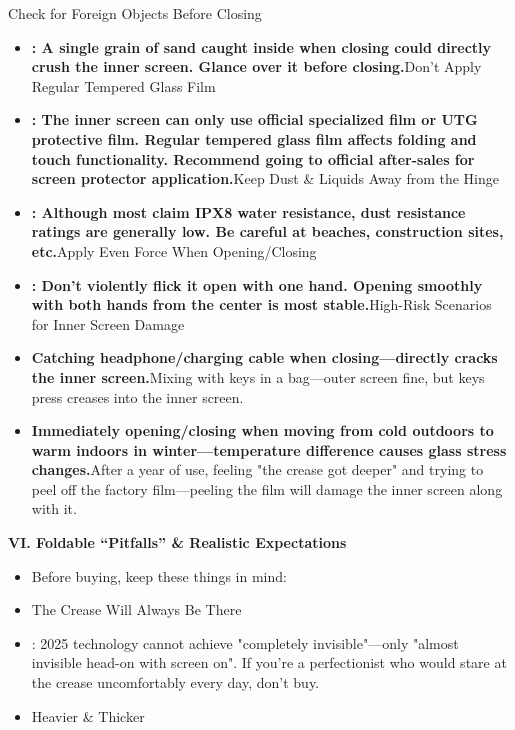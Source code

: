 
Check for Foreign Objects Before Closing

\begin{itemize}
  \item \textbf{: A single grain of sand caught inside when closing could directly crush the inner screen. Glance over it before closing.}Don't Apply Regular Tempered Glass Film
  \item \textbf{: The inner screen can only use official specialized film or UTG protective film. Regular tempered glass film affects folding and touch functionality. Recommend going to official after-sales for screen protector application.}Keep Dust \& Liquids Away from the Hinge
  \item \textbf{: Although most claim IPX8 water resistance, dust resistance ratings are generally low. Be careful at beaches, construction sites, etc.}Apply Even Force When Opening/Closing
  \item \textbf{: Don't violently flick it open with one hand. Opening smoothly with both hands from the center is most stable.}High-Risk Scenarios for Inner Screen Damage
  \item \textbf{Catching headphone/charging cable when closing—directly cracks the inner screen.}Mixing with keys in a bag—outer screen fine, but keys press creases into the inner screen.
  \item \textbf{Immediately opening/closing when moving from cold outdoors to warm indoors in winter—temperature difference causes glass stress changes.}After a year of use, feeling "the crease got deeper" and trying to peel off the factory film—peeling the film will damage the inner screen along with it.
\end{itemize}

\textbf{VI. Foldable “Pitfalls” \& Realistic Expectations}\par

\begin{itemize}
  \item Before buying, keep these things in mind:
  \item The Crease Will Always Be There
  \item : 2025 technology cannot achieve "completely invisible"—only "almost invisible head-on with screen on". If you're a perfectionist who would stare at the crease uncomfortably every day, don't buy.
  \item Heavier \& Thicker
\end{itemize}

